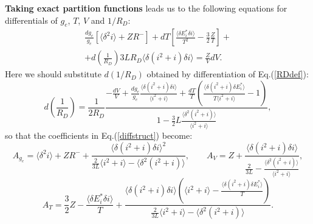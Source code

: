 {\bf Taking exact partition functions} leads us to the following equations for differentials of $g_e$, $T$, $V$ and $1/R_D$:
\begin{eqnarray}
\frac{dg_e}{g_e} \left[ \langle \delta^2 i \rangle + ZR^- \right] +
dT \left[ \frac{\langle \delta E^*_i \delta i \rangle}{T^2} - \frac32 \frac{Z}T \right] + \\
\nonumber + d\left( \frac{1}{R_D} \right) 3L R_D \langle \delta(i^2+i) \delta i \rangle = \frac{Z}V dV.
\end{eqnarray}
Here we should substitute $d(1/R_D)$ obtained by differentiation of Eq.(\ref{RDdef}):
\begin{equation}
d \left( \frac1{R_D} \right) = \frac{1}{2 R_D} \frac{-\frac{dV}{V} +
\frac{dg_e}{g_e} \frac{\langle \delta(i^2+i) \delta i \rangle}{\langle i^2+i \rangle} +
\frac{dT}{T} \left( \frac{\langle \delta(i^2+i) \delta E^*_i \rangle}{T \langle i^2+i \rangle} - 1 \right) }
{1 - \frac32L \frac{\langle \delta^2 (i^2+i) \rangle}{\langle i^2+i \rangle}},
\end{equation}
so that the coefficients in Eq.(\ref{diffstruct}) become:
\begin{equation}
A_{g_e} = \langle \delta^2 i \rangle + ZR^- + \frac{\langle \delta(i^2+i) \delta i \rangle^2}
{\frac{2}{3L} \langle i^2+i \rangle - \langle \delta^2 (i^2+i) \rangle}, \qquad
A_V = Z + \frac{\langle \delta(i^2+i) \delta i \rangle}
{\frac{2}{3L} - \frac{\langle \delta^2(i^2+i) \rangle}{\langle i^2+i \rangle}},
\end{equation}
\begin{equation}\nonumber
A_T = \frac32 Z - \frac{\langle \delta E^*_i \delta i \rangle}{T} +
\frac
{\langle \delta(i^2+i) \delta i \rangle \left( \langle i^2+i \rangle - \frac{\langle \delta(i^2+i) \delta E^*_i \rangle}{T} \right) }
{\frac{2}{3L} \langle i^2+i \rangle - \langle \delta^2(i^2+i) \rangle}.
\end{equation}

